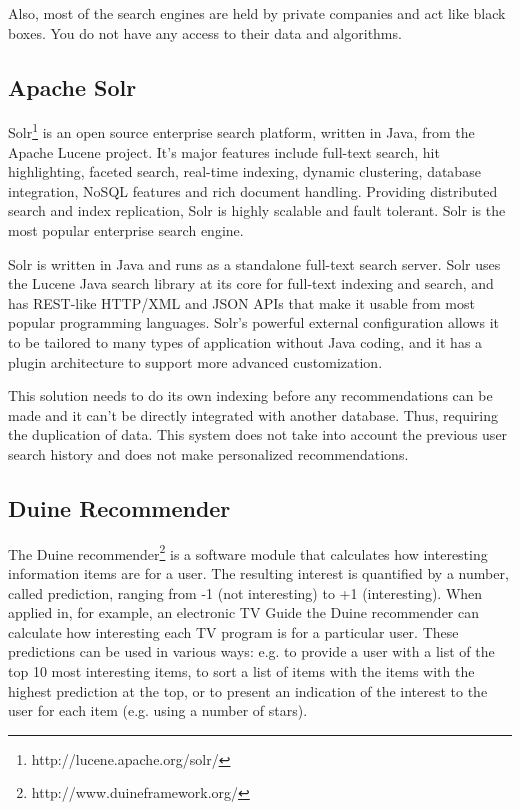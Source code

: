 Also, most of the search engines are held by private companies and act like black boxes. You do not have any access to their data and algorithms.


\subsection{Apache Solr }

Solr\footnote{http://lucene.apache.org/solr/} is an open source enterprise search platform, written in Java, from the Apache Lucene project. It's major features include full-text search, hit highlighting, faceted search, real-time indexing, dynamic clustering, database integration, NoSQL features and rich document handling. Providing distributed search and index replication, Solr is highly scalable and fault tolerant. Solr is the most popular enterprise search engine. 

Solr is written in Java and runs as a standalone full-text search server. Solr uses the Lucene Java search library at its core for full-text indexing and search, and has REST-like HTTP/XML and JSON APIs that make it usable from most popular programming languages. Solr's powerful external configuration allows it to be tailored to many types of application without Java coding, and it has a plugin architecture to support more advanced customization.

This solution needs to do its own indexing before any recommendations can be made and it can't be directly integrated with another database. Thus, requiring the duplication of data. This system does not take into account the previous user search history and does not make personalized recommendations.

\subsection{Duine Recommender }
The Duine recommender\footnote{http://www.duineframework.org/} is a software module that calculates how interesting information items are for a user. The resulting interest is quantified by a number, called prediction, ranging from -1 (not interesting) to +1 (interesting). When applied in, for example, an electronic TV Guide the Duine recommender can calculate how interesting each TV program is for a particular user. These predictions can be used in various ways: e.g. to provide a user with a list of the top 10 most interesting items, to sort a list of items with the items with the highest prediction at the top, or to present an indication of the interest to the user for each item (e.g. using a number of stars).


